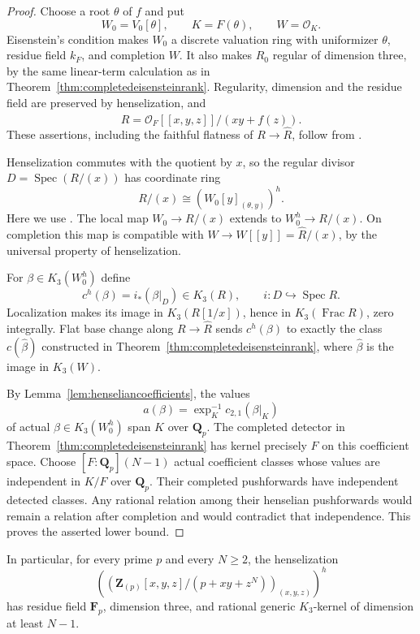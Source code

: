 \documentclass[11pt,a4paper]{article}
\theoremstyle{remark}
\newcommand{\Q}{\mathbf Q}
\newcommand{\Z}{\mathbf Z}
\newcommand{\F}{\mathbf F}
\newcommand{\OO}{\mathcal O}
\newcommand{\Spec}{\operatorname{Spec}}
\newcommand{\Frac}{\operatorname{Frac}}
\begin{document}
\begin{proof}
Choose a root $\theta$ of $f$ and put
\[
W_0=V_0[\theta],\qquad K=F(\theta),\qquad W=\OO_K.
\]
Eisenstein's condition makes $W_0$ a discrete valuation ring with
uniformizer $\theta$, residue field $k_F$, and completion $W$.
It also makes $R_0$ regular of dimension three, by the same linear-term
calculation as in Theorem~\ref{thm:completedeisensteinrank}.
Regularity, dimension and the residue field are preserved by
henselization, and
\[
\widehat R=\OO_F[[x,y,z]]/(xy+f(z)).
\]
These assertions, including the faithful flatness of $R\to\widehat R$,
follow from \cite[Section~15.46]{StacksHenselization}.

Henselization commutes with the quotient by $x$, so the regular divisor
$D=\Spec(R/(x))$ has coordinate ring
\[
R/(x)\cong \left(W_0[y]_{(\theta,y)}\right)^h.
\]
Here we use \cite[Section~10.156, Lemma~10.156.2]{StacksHenselization}.
The local map $W_0\to R/(x)$ extends to $W_0^h\to R/(x)$.
On completion this map is compatible with
$W\to W[[y]]=\widehat R/(x)$, by the universal property of
henselization.

For $\beta\in K_3(W_0^h)$ define
\[
c^h(\beta)=i_*(\beta|_D)\in K_3(R),
\qquad i:D\hookrightarrow\Spec R.
\]
Localization makes its image in $K_3(R[1/x])$, hence in
$K_3(\Frac R)$, zero integrally.  Flat base change along
$R\to\widehat R$ sends $c^h(\beta)$ to exactly the class $c(\widehat
\beta)$ constructed in Theorem~\ref{thm:completedeisensteinrank},
where $\widehat\beta$ is the image in $K_3(W)$.

By Lemma~\ref{lem:henseliancoefficients}, the values
\[
a(\beta)=\exp_K^{-1}c_{2,1}(\beta|_K)
\]
of actual $\beta\in K_3(W_0^h)$ span $K$ over $\Q_p$.
The completed detector in
Theorem~\ref{thm:completedeisensteinrank} has kernel precisely $F$
on this coefficient space.  Choose $[F:\Q_p](N-1)$ actual coefficient
classes whose values are independent in $K/F$ over $\Q_p$.
Their completed pushforwards have independent detected classes.
Any rational relation among their henselian pushforwards would remain
a relation after completion and would contradict that independence.
This proves the asserted lower bound.
\end{proof}

In particular, for every prime $p$ and every $N\geq2$, the henselization
\[
\left(\left(\Z_{(p)}[x,y,z]/(p+xy+z^N)\right)_{(x,y,z)}\right)^h
\]
has residue field $\F_p$, dimension three, and rational generic
$K_3$-kernel of dimension at least $N-1$.


\end{document}
